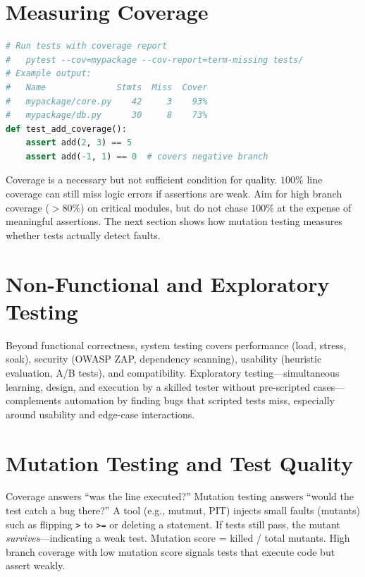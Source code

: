 \section{Measuring Coverage}

\begin{lstlisting}[language=Python,caption={Measuring coverage with pytest-cov.}]
# Run tests with coverage report
#   pytest --cov=mypackage --cov-report=term-missing tests/
# Example output:
#   Name              Stmts  Miss  Cover
#   mypackage/core.py    42     3    93%
#   mypackage/db.py      30     8    73%
def test_add_coverage():
    assert add(2, 3) == 5
    assert add(-1, 1) == 0  # covers negative branch
\end{lstlisting}

Coverage is a necessary but not sufficient condition for quality. $100\%$ line coverage can still miss logic errors if assertions are weak. Aim for high branch coverage ($>80\%$) on critical modules, but do not chase $100\%$ at the expense of meaningful assertions. The next section shows how mutation testing measures whether tests actually detect faults.


\section{Non-Functional and Exploratory Testing}

Beyond functional correctness, system testing covers performance (load, stress, soak), security (OWASP ZAP, dependency scanning), usability (heuristic evaluation, A/B tests), and compatibility. Exploratory testing---simultaneous learning, design, and execution by a skilled tester without pre-scripted cases---complements automation by finding bugs that scripted tests miss, especially around usability and edge-case interactions.


\section{Mutation Testing and Test Quality}

Coverage answers ``was the line executed?'' Mutation testing answers ``would the test catch a bug there?'' A tool (e.g., mutmut, PIT) injects small faults (mutants) such as flipping \texttt{>} to \texttt{>=} or deleting a statement. If tests still pass, the mutant \emph{survives}---indicating a weak test. Mutation score = killed / total mutants. High branch coverage with low mutation score signals tests that execute code but assert weakly.

